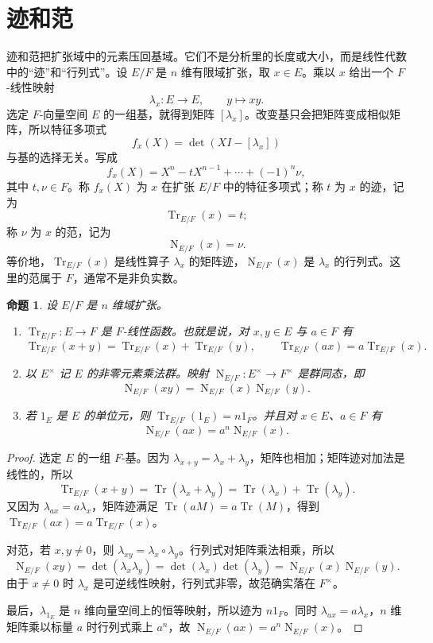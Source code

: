 \documentclass[11pt,a4paper,openany]{ctexbook}
\numberwithin{equation}{chapter}
\newcommand{\Tr}{\operatorname{Tr}}
\newcommand{\Nm}{\operatorname{N}}
\theoremstyle{plain}
\newtheorem{proposition}[theorem]{命题}
\theoremstyle{definition}
\theoremstyle{remark}
\begin{document}
\section{迹和范}
迹和范把扩张域中的元素压回基域。它们不是分析里的长度或大小，而是线性代数中的“迹”和“行列式”。设 $E/F$ 是 $n$ 维有限域扩张，取 $x\in E$。乘以 $x$ 给出一个 $F$-线性映射
\[
\lambda_x:E\longrightarrow E,\qquad y\longmapsto xy.
\]
选定 $F$-向量空间 $E$ 的一组基，就得到矩阵 $[\lambda_x]$。改变基只会把矩阵变成相似矩阵，所以特征多项式
\[
f_x(X)=\det(XI-[\lambda_x])
\]
与基的选择无关。写成
\[
f_x(X)=X^n-tX^{n-1}+\cdots+(-1)^n\nu,
\]
其中 $t,\nu\in F$。称 $f_x(X)$ 为 $x$ 在扩张 $E/F$ 中的特征多项式；称 $t$ 为 $x$ 的迹，记为
\[
\Tr_{E/F}(x)=t;
\]
称 $\nu$ 为 $x$ 的范，记为
\[
\Nm_{E/F}(x)=\nu.
\]
等价地，$\Tr_{E/F}(x)$ 是线性算子 $\lambda_x$ 的矩阵迹，$\Nm_{E/F}(x)$ 是 $\lambda_x$ 的行列式。这里的范属于 $F$，通常不是非负实数。

\begin{proposition}
设 $E/F$ 是 $n$ 维域扩张。
\begin{enumerate}[label=(\arabic*)]
\item $\Tr_{E/F}:E\to F$ 是 $F$-线性函数。也就是说，对 $x,y\in E$ 与 $a\in F$ 有
\[
\Tr_{E/F}(x+y)=\Tr_{E/F}(x)+\Tr_{E/F}(y),\qquad
\Tr_{E/F}(ax)=a\Tr_{E/F}(x).
\]
\item 以 $E^\times$ 记 $E$ 的非零元素乘法群。映射 $\Nm_{E/F}:E^\times\to F^\times$ 是群同态，即
\[
\Nm_{E/F}(xy)=\Nm_{E/F}(x)\Nm_{E/F}(y).
\]
\item 若 $1_E$ 是 $E$ 的单位元，则 $\Tr_{E/F}(1_E)=n1_F$。并且对 $x\in E$、$a\in F$ 有
\[
\Nm_{E/F}(ax)=a^n\Nm_{E/F}(x).
\]
\end{enumerate}
\end{proposition}

\begin{proof}
选定 $E$ 的一组 $F$-基。因为 $\lambda_{x+y}=\lambda_x+\lambda_y$，矩阵也相加；矩阵迹对加法是线性的，所以
\[
\Tr_{E/F}(x+y)=\operatorname{Tr}(\lambda_x+\lambda_y)
=\operatorname{Tr}(\lambda_x)+\operatorname{Tr}(\lambda_y).
\]
又因为 $\lambda_{ax}=a\lambda_x$，矩阵迹满足 $\operatorname{Tr}(aM)=a\operatorname{Tr}(M)$，得到 $\Tr_{E/F}(ax)=a\Tr_{E/F}(x)$。

对范，若 $x,y\ne0$，则 $\lambda_{xy}=\lambda_x\circ\lambda_y$。行列式对矩阵乘法相乘，所以
\[
\Nm_{E/F}(xy)=\det(\lambda_x\lambda_y)=\det(\lambda_x)\det(\lambda_y)
=\Nm_{E/F}(x)\Nm_{E/F}(y).
\]
由于 $x\ne0$ 时 $\lambda_x$ 是可逆线性映射，行列式非零，故范确实落在 $F^\times$。

最后，$\lambda_{1_E}$ 是 $n$ 维向量空间上的恒等映射，所以迹为 $n1_F$。同时 $\lambda_{ax}=a\lambda_x$，$n$ 维矩阵乘以标量 $a$ 时行列式乘上 $a^n$，故 $\Nm_{E/F}(ax)=a^n\Nm_{E/F}(x)$。
\end{proof}
\end{document}
